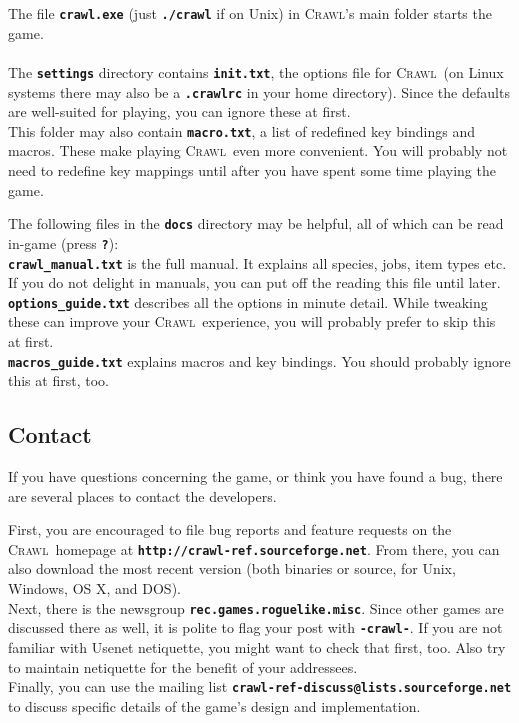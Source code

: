 \documentclass[a4paper,10pt]{article}
\newcommand{\key}[1]{{{\texttt{\textbf{#1}}}}} %
\newcommand{\crawl}{\textsc{Crawl}}
\newcommand{\spacecolumn}{\begin{minipage}[t]{2cm}\phantom{xxxx}\end{minipage}}
\begin{document}
\begin{minipage}[t]{7cm}
The file \key{crawl.exe} (just \key{./crawl} if on Unix) in \crawl's main 
folder starts the game.
\\ \\
The \key{settings} directory contains \key{init.txt}, the options file for
\crawl\ (on Linux systems there may also be a \key{.crawlrc} in your home
directory). Since the defaults are well-suited for playing, you can ignore
these at first.
\\
This folder may also contain \key{macro.txt}, a list of redefined key 
bindings and macros. These make playing \crawl\ even more convenient. 
You will probably not need to redefine key mappings until after you have
spent some time playing the game.
\end{minipage}
%
\spacecolumn
%
\begin{minipage}[t]{7cm}
The following files in the \key{docs} directory may be helpful, all of
which can be read in-game (press \key{?}):
\\
\key{crawl\_manual.txt} is the full manual. It explains all species, jobs, 
item types etc. If you do not delight in manuals, you can put off the 
reading this file until later.
\\
\key{options\_guide.txt} describes all the options in minute detail. While
tweaking these can improve your \crawl\ experience, you will probably prefer
to skip this at first.
\\
\key{macros\_guide.txt} explains macros and key bindings. You should probably
ignore this at first, too.
\end{minipage}

\subsection*{Contact}
	    
If you have questions concerning the game, or think you have found a bug, 
there are several places to contact the developers. 

First, you are encouraged to file bug reports and feature requests on the 
\crawl\ homepage at \key{http://crawl-ref.sourceforge.net}. From there, you 
can also download the most recent version (both binaries or source, for 
Unix, Windows, OS X, and DOS).
\\
Next, there is the newsgroup \key{rec.games.roguelike.misc}. Since other 
games are discussed there as well, it is polite to flag your post with 
\key{-crawl-}. If you are not familiar with Usenet netiquette, you might 
want to check that first, too. Also try to maintain netiquette for the 
benefit of your addressees.
\\
Finally, you can use the mailing list 
\key{crawl-ref-discuss@lists.sourceforge.net}
to discuss specific details of the game's design and implementation.
\end{document}

